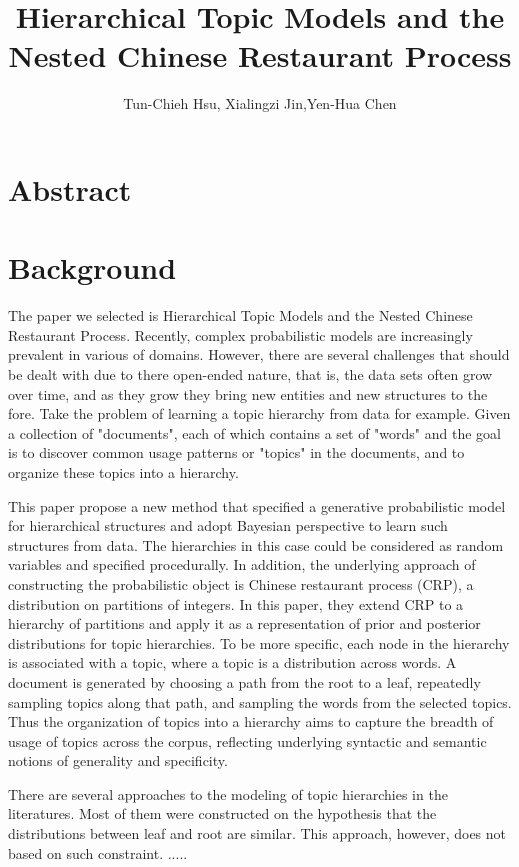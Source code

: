 \documentclass[a4paper]{article}
\title{Hierarchical Topic Models and
the Nested Chinese Restaurant Process}
\author{Tun-Chieh Hsu, Xialingzi Jin,Yen-Hua Chen}
\begin{document}
\maketitle



\section{Abstract}


\section{Background}

The paper we selected is Hierarchical Topic Models and
the Nested Chinese Restaurant Process. 
Recently, complex probabilistic models are increasingly prevalent in various of  domains. However, there are several challenges that should be dealt with due to there open-ended nature, that is, the data sets often grow over time, and as they grow they bring new entities and new structures to the fore. Take the problem of learning a topic hierarchy from data for example. Given a collection of "documents", each of which contains a
set of "words" and the goal is to discover common usage patterns or "topics" in the documents,
and to organize these topics into a hierarchy. 


This paper propose a new method that specified a generative probabilistic model
for hierarchical structures and adopt Bayesian perspective to learn such structures from data. 
The hierarchies in this case could be considered as random variables and specified procedurally.
In addition, the underlying approach of constructing the probabilistic object is Chinese restaurant process (CRP), a distribution on partitions of integers. In this paper, they extend CRP to a hierarchy of partitions and apply it as a representation of prior and posterior distributions for topic hierarchies. To be more specific, each node in the hierarchy is associated with a topic, where a topic is a distribution across
words. A document is generated by choosing a path from the root to a leaf, repeatedly
sampling topics along that path, and sampling the words from the selected topics. Thus
the organization of topics into a hierarchy aims to capture the breadth of usage of topics
across the corpus, reflecting underlying syntactic and semantic notions of generality and
specificity. 

There are several approaches to the modeling of topic hierarchies in the literatures. Most of them were constructed on the hypothesis that the distributions between leaf and root are similar. This approach, however, does not based on such constraint. ..... 
\end{document}
